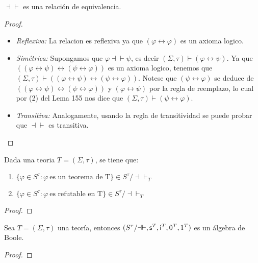   \begin{lemma} \label{lemma_74}
    \PN $\dashv \vdash$ es una relación de equivalencia.
  \end{lemma}
  \begin{proof}
    \PN \newline
    \begin{itemize}
      \item \textit{Reflexiva:} La relacion es reflexiva ya que $(\varphi \leftrightarrow \varphi )$ es un axioma logico.
      \item \textit{Simétrica:} Supongamos que $\varphi \dashv \vdash \psi $, es decir $(\Sigma, \tau)\vdash \left( \varphi \leftrightarrow \psi \right) $. Ya que $((\varphi \leftrightarrow \psi )\leftrightarrow (\psi \leftrightarrow \varphi ))$ es un axioma logico, tenemos que $(\Sigma, \tau)\vdash ((\varphi \leftrightarrow \psi )\leftrightarrow (\psi \leftrightarrow \varphi ))$. Notese que $\left( \psi \leftrightarrow \varphi \right) $ se deduce de $((\varphi \leftrightarrow \psi )\leftrightarrow (\psi \leftrightarrow \varphi ))$ y $(\varphi \leftrightarrow \psi )$ por la regla de reemplazo, lo cual por (2) del Lema 155 nos dice que $(\Sigma, \tau)\vdash \left( \psi \leftrightarrow \varphi \right) $.

      \item \textit{Transitiva:}   Analogamente, usando la regla de transitividad se puede probar que $\dashv \vdash $ es transitiva.
    \end{itemize}
  \end{proof}

  \begin{lemma} \label{lemma_75}
    \PN Dada una teoria $T = (\Sigma, \tau)$, se tiene que:
    \begin{enumerate}[(1)]
      \item $\{\varphi \in S^{\tau}: \varphi \ \text{es un teorema de T}\} \in S^{\tau}/ \dashv \vdash_{T}$
      \item $\{\varphi \in S^{\tau}: \varphi \ \text{es refutable en T}\} \in S^{\tau}/ \dashv \vdash_{T}$
    \end{enumerate}
  \end{lemma}
  \begin{proof}
  \end{proof}

  \begin{lemma} \label{lemma_76}
    \PN Sea $T = (\Sigma, \tau)$ una teoría, entonces $(S^{\tau}/\mathrm{\dashv \vdash}, \mathsf{s}^{T}, \mathsf{i}^{T}, 0^{T},
    1^{T})$ es un álgebra de Boole.
  \end{lemma}
  \begin{proof}
  \end{proof}

